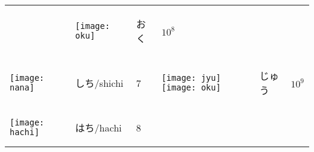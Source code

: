 \documentclass[a4paper,12pt]{extarticle}
\begin{document}
\begin{longtable}{|lll|lll|}
	                                   &
	\begin{minipage}{0.2\textwidth}
		\centerline{
			\texttt{[image: oku]}
		}
	\end{minipage}
	                                   &
	\begin{CJK}{UTF8}{min}おく\end{CJK}
	                                   &
	$10^{8}$
	\\
	\begin{minipage}{0.2\textwidth}
		\centerline{
			\texttt{[image: nana]}
		}
	\end{minipage}
	                                   &
	\begin{CJK}{UTF8}{min}しち/shichi\end{CJK}
	                                   &
	7

	                                   &
	\begin{minipage}{0.2\textwidth}
		\centerline{
			\texttt{[image: jyu]}
			\texttt{[image: oku]}
		}
	\end{minipage}
	                                   &
	\begin{CJK}{UTF8}{min}じゅう\end{CJK}
	                                   &
	$10^{9}$
	\\
	\begin{minipage}{0.2\textwidth}
		\centerline{
			\texttt{[image: hachi]}
		}
	\end{minipage}
	                                   &
	\begin{CJK}{UTF8}{min}はち/hachi\end{CJK}
	                                   &
	8


\end{longtable}
\end{document}
